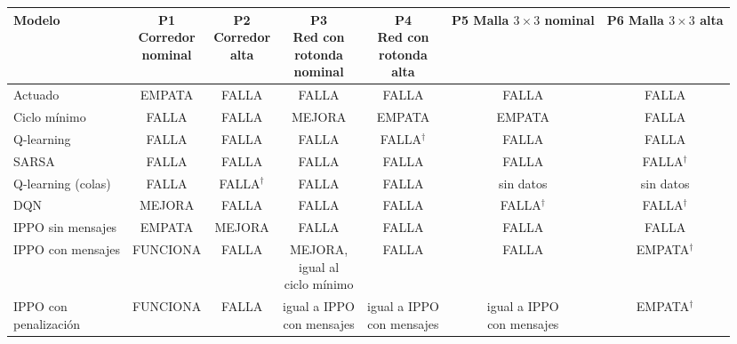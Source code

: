 \begin{table}[!tbp]
\centering
\scriptsize
\setlength{\tabcolsep}{3pt}
\begin{tabular}{lcccccc}
\toprule
Modelo & \makecell{P1\\Corredor\\nominal} & \makecell{P2\\Corredor\\alta} & \makecell{P3\\Red con\\rotonda\\nominal} & \makecell{P4\\Red con\\rotonda\\alta} & \makecell{P5\\Malla $3 \times 3$\\nominal} & \makecell{P6\\Malla $3 \times 3$\\alta} \\
\midrule
Actuado & EMPATA & FALLA & FALLA & FALLA & FALLA & FALLA \\
Ciclo mínimo & FALLA & FALLA & MEJORA & EMPATA & EMPATA & FALLA \\
Q-learning & FALLA & FALLA & FALLA & FALLA$^{\dagger}$ & FALLA & FALLA \\
SARSA & FALLA & FALLA & FALLA & FALLA & FALLA & FALLA$^{\dagger}$ \\
Q-learning (colas) & FALLA & FALLA$^{\dagger}$ & FALLA & FALLA & sin datos & sin datos \\
DQN & MEJORA & FALLA & FALLA & FALLA & FALLA$^{\dagger}$ & FALLA$^{\dagger}$ \\
IPPO sin mensajes & EMPATA & MEJORA & FALLA & FALLA & FALLA & FALLA \\
IPPO con mensajes & FUNCIONA & FALLA & \makecell{MEJORA,\\igual al\\ciclo mínimo} & FALLA & FALLA & EMPATA$^{\dagger}$ \\
\makecell[l]{IPPO con\\penalización} & FUNCIONA & FALLA & \makecell{igual a IPPO\\con mensajes} & \makecell{igual a IPPO\\con mensajes} & \makecell{igual a IPPO\\con mensajes} & EMPATA$^{\dagger}$ \\

\end{tabular}
\end{table}
